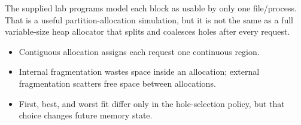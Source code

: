 \begin{pitfall}
The supplied lab programs model each block as usable by only one file/process. That is a useful partition-allocation simulation, but it is not the same as a full variable-size heap allocator that splits and coalesces holes after every request.
\end{pitfall}





\begin{chapterrecap}
\begin{itemize}
  \item Contiguous allocation assigns each request one continuous region.
  \item Internal fragmentation wastes space inside an allocation; external fragmentation scatters free space between allocations.
  \item First, best, and worst fit differ only in the hole-selection policy, but that choice changes future memory state.
\end{itemize}
\end{chapterrecap}
